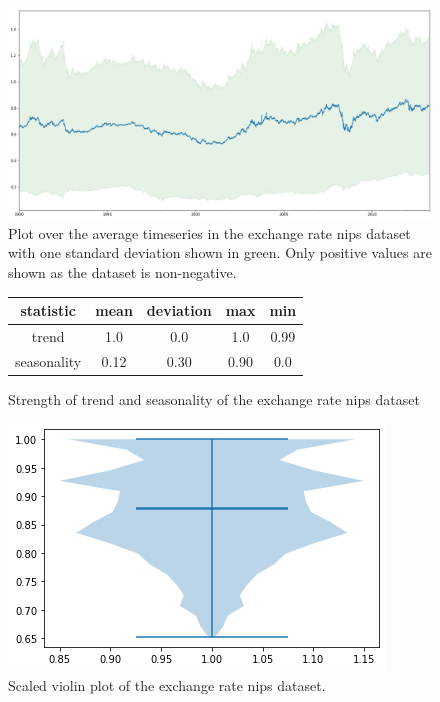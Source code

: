 \begin{figure}[htb]
    \centering
      \includegraphics[width=\linewidth]{4_designing/figures/exchange_rate_nips_plot.png}
      \caption{Plot over the average timeseries in the exchange rate nips dataset with one standard deviation shown in green. Only positive values are shown as the dataset is non-negative.}
      \label{fig:exchange_rate_nips_plot}
    \endminipage\hfill
\end{figure}

\begin{figure}[htb]
    \centering
        \begin{center}
            \begin{tabular}{||c | c | c | c | c |} 
                \hline
                statistic & mean & deviation & max & min\\
                \hline
                trend & 1.0 & 0.0 & 1.0 & 0.99 \\
                \hline
                seasonality & 0.12 & 0.30 & 0.90 & 0.0 \\
                \hline
                \hline
            \end{tabular}
            \caption{Strength of trend and seasonality of the exchange rate nips dataset}
        \end{center}
    \endminipage\hfill
      \includegraphics[width=\linewidth]{4_designing/figures/exchange_rate_nips_violin.png}
      \caption{Scaled violin plot of the exchange rate nips dataset.}
      \label{fig:exchange_rate_nips_violin}
    \endminipage\hfill
\end{figure}

